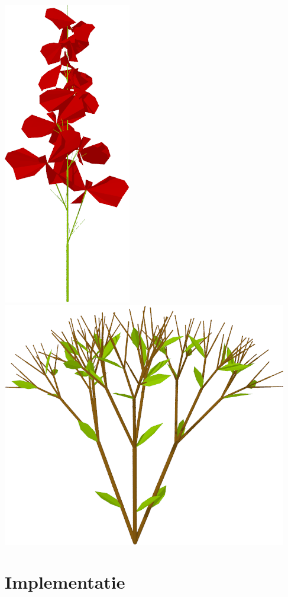 \documentclass[ignorenonframetext,compress]{beamer}
\begin{document}
\begin{frame}[fragile]
	\frametitle{}
\begin{center}
\includegraphics[height=0.8\textheight]{lily_red.png}
\includegraphics[height=0.8\textheight]{plant6.png}
\end{center}
\end{frame}

\section{Implementatie}
\end{document}
